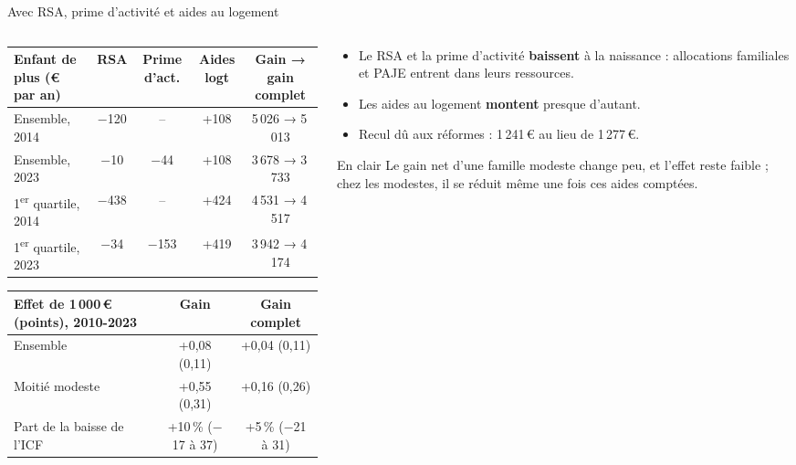 \documentclass[10pt,aspectratio=169]{beamer}
\begin{document}
\begin{frame}{Avec RSA, prime d'activité et aides au logement}
  \begin{columns}[T]
    \begin{column}{0.60\textwidth}
      \scriptsize\setlength{\tabcolsep}{3pt}
      \begin{tabular}{@{}lcccc@{}}
        \toprule
        Enfant de plus (€ par an) & RSA & Prime d'act. & Aides logt & Gain → gain complet \\
        \midrule
        Ensemble, 2014 & $-$120 & -- & +108 & 5\,026 → 5\,013 \\
        Ensemble, 2023 & $-$10 & $-$44 & +108 & 3\,678 → 3\,733 \\
        1\textsuperscript{er} quartile, 2014 & $-$438 & -- & +424 & 4\,531 → 4\,517 \\
        1\textsuperscript{er} quartile, 2023 & $-$34 & $-$153 & +419 & 3\,942 → 4\,174 \\
        \bottomrule
      \end{tabular}
      \vspace{0.2cm}

      \begin{tabular}{@{}lcc@{}}
        \toprule
        Effet de 1\,000\,€ (points), 2010-2023 & Gain & Gain complet \\
        \midrule
        Ensemble & +0,08 (0,11) & +0,04 (0,11) \\
        Moitié modeste & +0,55 (0,31) & +0,16 (0,26) \\
        Part de la baisse de l'ICF & +10\,\% ($-$17 à 37) & +5\,\% ($-$21 à 31) \\
        \bottomrule
      \end{tabular}
    \end{column}
    \begin{column}{0.36\textwidth}
      \footnotesize
      \begin{itemize}\setlength{\itemsep}{0.3em}
        \item Le RSA et la prime d'activité \textbf{baissent} à la naissance : allocations familiales et PAJE entrent dans leurs ressources.
        \item Les aides au logement \textbf{montent} presque d'autant.
        \item Recul dû aux réformes : 1\,241\,€ au lieu de 1\,277\,€.
      \end{itemize}
      \begin{callout}[tdtenavy]{En clair}
        \scriptsize\RaggedRight Le gain net d'une famille modeste change peu, et l'effet reste faible ; chez les modestes, il se réduit même une fois ces aides comptées.
      \end{callout}
    \end{column}
  \end{columns}
\end{frame}
\end{document}
